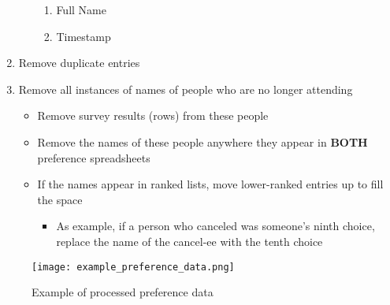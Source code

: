 \begin{enumerate}
\begin{itemize}
				\begin{enumerate}
					\item Full Name
					\item Timestamp
				\end{enumerate}
		\end{itemize}
	\item Remove duplicate entries
	\item Remove all instances of names of people who are no longer attending
		\begin{itemize}
			\item Remove survey results (rows) from these people
			\item Remove the names of these people anywhere they appear in \textbf{BOTH} preference spreadsheets
			\item If the names appear in ranked lists, move lower-ranked entries up to fill the space
				\begin{itemize}
					\item As example, if a person who canceled was someone's ninth choice, replace the name of the cancel-ee with the tenth choice
				\end{itemize}
		\end{itemize}
			
	
			
			
\end{enumerate}


\begin{figure}
	\centering
	\texttt{[image: example\_preference\_data.png]}
	\caption{\label{fig:example_preference_data} Example of processed preference data}
\end{figure}

